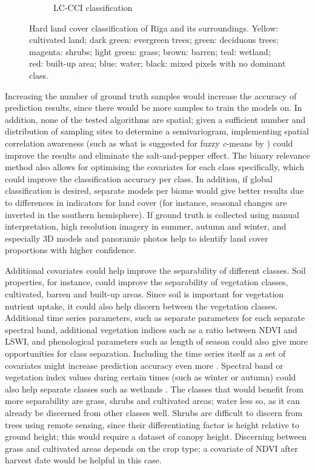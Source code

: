 \documentclass[a4paper,12pt]{scrbook}
\begin{document}
\begin{figure}
\begin{subfigure}{0.48\textwidth}
    \caption{LC-CCI classification}
  \end{subfigure}
  \caption{Hard land cover classification of Riga and its surroundings. Yellow: cultivated land; dark green: evergreen trees; green: deciduous trees; magenta: shrubs; light green: grass; brown: barren; teal: wetland; red: built-up area; blue: water; black: mixed pixels with no dominant class.}
  \label{fig-hard-rf}
\end{figure}

Increasing the number of ground truth samples would increase the accuracy of prediction results, since there would be more samples to train the models on. In addition, none of the tested algorithms are spatial; given a sufficient number and distribution of sampling sites to determine a semivariogram, implementing spatial correlation awareness (such as what is suggested for fuzzy \textit{c}-means by \citet{gong2013improvedcmeans}) could improve the results and eliminate the salt-and-pepper effect. The binary relevance method also allows for optimising the covariates for each class specifically, which could improve the classification accuracy per class. In addition, if global classification is desired, separate models per biome would give better results due to differences in indicators for land cover (for instance, seasonal changes are inverted in the southern hemisphere). If ground truth is collected using manual interpretation, high resolution imagery in summer, autumn and winter, and especially 3D models and panoramic photos help to identify land cover proportions with higher confidence.

Additional covariates could help improve the separability of different classes. Soil properties, for instance, could improve the separability of vegetation classes, cultivated, barren and built-up areas. Since soil is important for vegetation nutrient uptake, it could also help discern between the vegetation classes. Additional time series parameters, such as separate parameters for each separate spectral band, additional vegetation indices such as a ratio between NDVI and LSWI, and phenological parameters such as length of season could also give more opportunities for class separation. Including the time series itself as a set of covariates might increase prediction accuracy even more \citep{Pelletier2016hardrf}. Spectral band or vegetation index values during certain times (such as winter or autumn) could also help separate classes such as wetlands \citep{davranche2010wetland}. The classes that would benefit from more separability are grass, shrubs and cultivated areas; water less so, as it can already be discerned from other classes well. Shrubs are difficult to discern from trees using remote sensing, since their differentiating factor is height relative to ground height; this would require a dataset of canopy height. Discerning between grass and cultivated areas depends on the crop type; a covariate of NDVI after harvest date would be helpful in this case.
\end{document}
